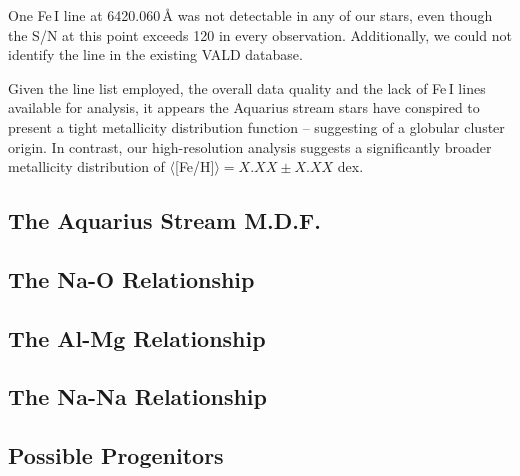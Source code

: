 \documentclass{emulateapj}
\begin{document}
One Fe\,I line at 6420.060\,\AA{} was not detectable in any of our stars, even though the S/N at this point exceeds 120 in every observation. Additionally, we could not identify the line in the existing VALD database.



Given the line list employed, the overall data quality and the lack of Fe\,I lines available for analysis, it appears the Aquarius stream stars have conspired to present a tight metallicity distribution function -- suggesting of a globular cluster origin. In contrast, our high-resolution analysis suggests a significantly broader metallicity distribution of $\langle$[Fe/H]$\rangle = X.XX \pm X.XX$ dex.

\subsection{The Aquarius Stream M.D.F.}

\subsection{The Na-O Relationship}

\subsection{The Al-Mg Relationship}

\subsection{The Na-Na Relationship}

\subsection{Possible Progenitors}







\end{document}
